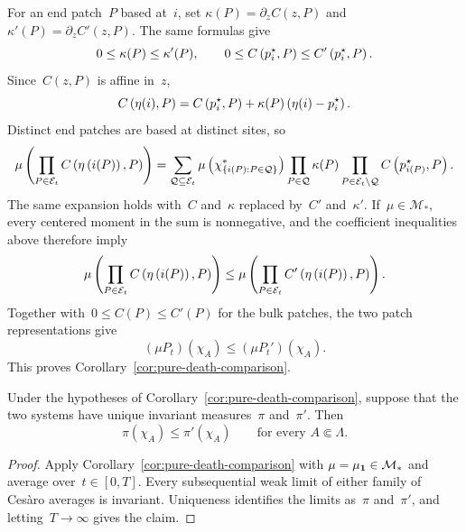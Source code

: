 For an end patch~$P$ based at~$i$, set
$\kappa(P)=\partial_zC(z,P)$ and
$\kappa'(P)=\partial_zC'(z,P)$. The same formulas give
\begin{equation*}
0\leq\kappa(P)\leq\kappa'(P),
\qquad
0\leq C\left(p_i^\star,P\right)
\leq C'\left(p_i^\star,P\right).
\end{equation*}
Since~$C(z,P)$ is affine in~$z$,
\begin{equation*}
C\left(\eta(i),P\right)
=
C\left(p_i^\star,P\right)
+
\kappa(P)\left(\eta(i)-p_i^\star\right).
\end{equation*}
Distinct end patches are based at distinct sites, so
\begin{equation*}
\mu\left(
\prod_{P\in\mathcal E_t}C\left(\eta\left(i(P)\right),P\right)
\right)
=
\sum_{\mathcal Q\subseteq\mathcal E_t}
\mu\left(\chi_{\left\{i(P):P\in\mathcal Q\right\}}^*\right)
\prod_{P\in\mathcal Q}\kappa(P)
\prod_{P\in\mathcal E_t\setminus\mathcal Q}
C\left(p_{i(P)}^\star,P\right).
\end{equation*}
The same expansion holds with~$C$ and~$\kappa$ replaced by~$C'$ and~$\kappa'$.
If~$\mu\in\mathcal M_*$, every centered moment in the sum is nonnegative, and
the coefficient inequalities above therefore imply
\begin{equation*}
\mu\left(
\prod_{P\in\mathcal E_t}C\left(\eta\left(i(P)\right),P\right)
\right)
\leq
\mu\left(
\prod_{P\in\mathcal E_t}C'\left(\eta\left(i(P)\right),P\right)
\right).
\end{equation*}
Together with~$0\leq C(P)\leq C'(P)$ for the bulk patches, the two patch
representations give
\begin{equation*}
(\mu P_t)(\chi_A)
\leq
(\mu P_t')(\chi_A).
\end{equation*}
This proves Corollary~\ref{cor:pure-death-comparison}.

\begin{corollary}
\label{cor:pure-death-invariant-comparison}
Under the hypotheses of Corollary~\ref{cor:pure-death-comparison}, suppose that
the two systems have unique invariant measures~$\pi$ and~$\pi'$. Then
\begin{equation*}
\pi(\chi_A)\leq\pi'(\chi_A)
\qquad
\text{for every }A\Subset\Lambda.
\end{equation*}
\end{corollary}

\begin{proof}
Apply Corollary~\ref{cor:pure-death-comparison} with
$\mu=\mu_{\mathbf{1}}\in\mathcal M_*$ and average over~$t\in[0,T]$. Every
subsequential weak limit of either family of Ces\`aro averages is invariant.
Uniqueness identifies the limits as~$\pi$ and~$\pi'$, and letting~$T\to\infty$
gives the claim.
\end{proof}
